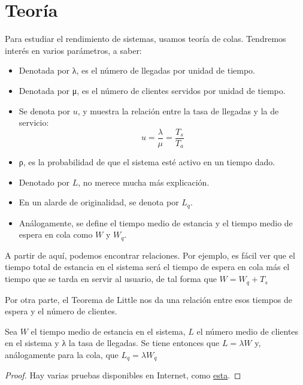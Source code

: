 \section{Teoría}

Para estudiar el rendimiento de sistemas, usamos teoría de colas. Tendremos interés en varios parámetros, a saber:

\begin{itemize}
\item {} Denotada por λ, es el número de llegadas por unidad de tiempo.
\item {} Denotada por μ, es el número de clientes servidos por unidad de tiempo.
\item {} Se denota por $u$, y muestra la relación entre la tasa de llegadas y la de servicio: \[ u = \frac{λ}{μ} = \frac{T_s}{T_a} \]
\item {} ρ, es la probabilidad de que el sistema esté activo en un tiempo dado.
\item {} Denotado por $L$, no merece mucha más explicación.
\item {} En un alarde de originalidad, se denota por $L_q$.
\item Análogamente, se define el tiempo medio de estancia y el tiempo medio de espera en cola como $W$ y $W_q$.
\end{itemize}

A partir de aquí, podemos encontrar relaciones. Por ejemplo, es fácil ver que el tiempo total de estancia en el sistema será el tiempo de espera en cola más el tiempo que se tarda en servir al usuario, de tal forma que \( W = W_q + T_s \label{colas:TiempoTotal} \)

Por otra parte, el Teorema de Little nos da una relación entre esos tiempos de espera y el número de clientes.

\begin{theorem} Sea $W$ el tiempo medio de estancia en el sistema, $L$ el número medio de clientes en el sistema y λ la tasa de llegadas. Se tiene entonces que \( L = λ W \label{colas:Little} \) y, análogamente para la cola, que \( L_q = λ W_q \label{colas:LittleQ} \)
\end{theorem}

\begin{proof} Hay varias pruebas disponibles en Internet, como \href{http://pubsonline.informs.org/doi/pdf/10.1287/opre.22.2.417}{esta}.
\end{proof}

